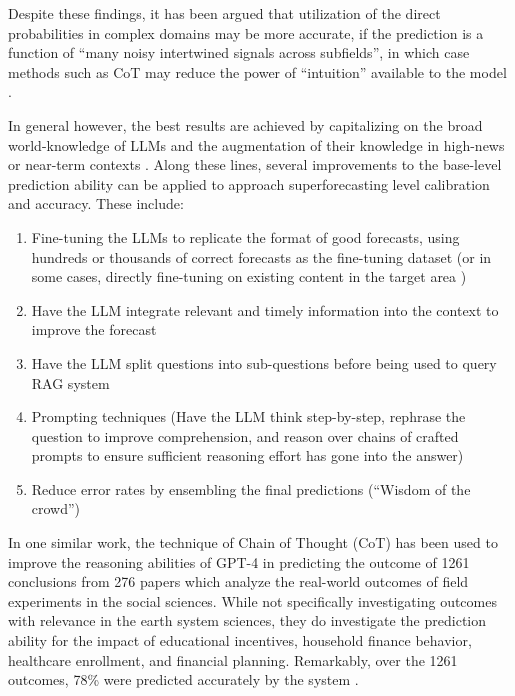 \documentclass[12pt,a4paper]{article}
\begin{document}
Despite these findings, it has been argued that utilization of the direct probabilities in complex domains may be more accurate, if the prediction is a function of ``many noisy intertwined signals across subfields'', in which case methods such as CoT may reduce the power of ``intuition'' available to the model .

In general however, the best results are achieved by capitalizing on the broad world-knowledge of LLMs and the augmentation of their knowledge in high-news or near-term contexts . Along these lines, several improvements to the base-level prediction ability can be applied to approach superforecasting level calibration and accuracy. These include: 
\begin{enumerate}
\item Fine-tuning the LLMs to replicate the format of good forecasts, using hundreds or thousands of correct forecasts as the fine-tuning dataset (or in some cases, directly fine-tuning on existing content in the target area )
\item Have the LLM integrate relevant and timely information into the context to improve the forecast
\item Have the LLM split questions into sub-questions before being used to query RAG system
\item Prompting techniques (Have the LLM think step-by-step, rephrase the question to improve comprehension, and reason over chains of crafted prompts to ensure sufficient reasoning effort has gone into the answer)
\item Reduce error rates by ensembling the final predictions (``Wisdom of the crowd'')
\end{enumerate}


In one similar work, the technique of Chain of Thought (CoT) has been used to improve the reasoning abilities of GPT-4 in predicting the outcome of 1261 conclusions from 276 papers which analyze the real-world outcomes of field experiments in the social sciences. While not specifically investigating outcomes with relevance in the earth system sciences, they do investigate the prediction ability for the impact of educational incentives, household finance behavior, healthcare enrollment, and financial planning. Remarkably, over the 1261 outcomes, 78\% were predicted accurately by the system .
\end{document}
